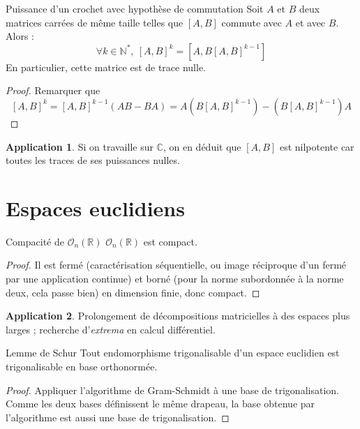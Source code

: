 \documentclass[french]{article}
\newcommand{\N}{\mathbb{N}}
\newcommand{\R}{\mathbb{R}}
\newcommand{\C}{\mathbb{C}}
\newcommand{\st}{^*}
\theoremstyle{definition}
\newtheorem*{app}{Application}
\begin{document}
\begin{lem}{Puissance d'un crochet avec hypothèse de commutation}
	Soit $A$ et $B$ deux matrices carrées de même taille telles que $[A,B]$ commute avec $A$ et avec $B$. Alors : $$\forall k\in\N\st,\ [A,B]^k=\left[A,B[A,B]^{k-1}\right]$$ En particulier, cette matrice est de trace nulle.
\end{lem}
\begin{proof}
	Remarquer que $$[A,B]^k=[A,B]^{k-1}(AB-BA)=A(B[A,B]^{k-1})-(B[A,B]^{k-1})A$$
\end{proof}
\begin{app}
	Si on travaille sur $\C$, on en déduit que $[A,B]$ est nilpotente car toutes les traces de ses puissances nulles. 
\end{app}

\section{Espaces euclidiens}

\begin{lem}{Compacité de $\mathcal{O}_n(\R)$}
	$\mathcal{O}_n(\R)$ est compact.
\end{lem}
\begin{proof}
	Il est fermé (caractérisation séquentielle, ou image réciproque d'un fermé par une application continue) et borné (pour la norme subordonnée à la norme deux, cela passe bien) en dimension finie, donc compact.
\end{proof}
\begin{app}
	Prolongement de décompositions matricielles à des espaces plus larges ; recherche d'\textit{extrema} en calcul différentiel.
\end{app}

\begin{lem}{Lemme de Schur}
	Tout endomorphisme trigonalisable d'un espace euclidien est trigonalisable en base orthonormée.
\end{lem}
\begin{proof}
	Appliquer l'algorithme de Gram-Schmidt à une base de trigonalisation. Comme les deux bases définissent le même drapeau, la base obtenue par l'algorithme est aussi une base de trigonalisation.
\end{proof}
\end{document}
